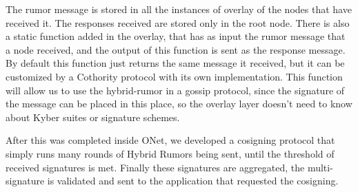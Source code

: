 The rumor message is stored in all the instances of overlay of the nodes that have received it. The responses received are stored only in the root node. There is also a static function added in the overlay, that has as input the rumor message that a node received, and the output of this function is sent as the response message. By default this function just returns the same message it received, but it can be customized by a Cothority protocol with its own implementation. This function will allow us to use the hybrid-rumor in a gossip protocol, since the signature of the message can be placed in this place, so the overlay layer doesn't need to know about Kyber suites or signature schemes.

After this was completed inside ONet, we developed a cosigning protocol that simply runs many rounds of Hybrid Rumors being sent, until the threshold of received signatures is met. Finally these signatures are aggregated, the multi-signature is validated and sent to the application that requested the cosigning.
